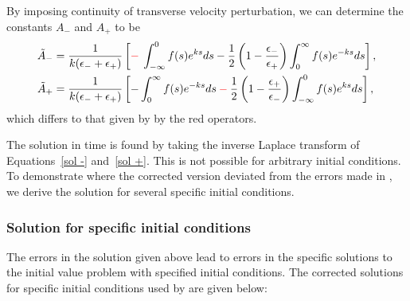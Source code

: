 \documentclass[12pt]{../style-files/ociamthesis}
\begin{document}
By imposing continuity of transverse velocity perturbation, we can determine the constants $A_-$ and $A_+$ to be
\begin{align}
\tilde{A}_- & = \frac{1}{k(\epsilon_- + \epsilon_+)}\left[\textcolor{red}{-} \: \int_{-\infty}^0 f(s)e^{ks} ds - \frac{1}{2}\left(1 - \frac{\epsilon_-}{\epsilon_+}\right)\int_0^\infty f(s)e^{-ks} ds\right], \\
\tilde{A}_+ & = \frac{1}{k(\epsilon_- + \epsilon_+)}\left[-\int_0^\infty f(s)e^{-ks} ds \: \textcolor{red}{-} \: \frac{1}{2}\left(1 - \frac{\epsilon_+}{\epsilon_-}\right)\int_{-\infty}^0 f(s)e^{ks} ds\right],
\end{align}
which differs to that given by \cite{rae_etal81} by the red operators.

The solution in time is found by taking the inverse Laplace transform of Equations~\eqref{sol -} and~\eqref{sol +}. This is not possible for arbitrary initial conditions. To demonstrate where the corrected version deviated from the errors made in \cite{rae_etal81}, we derive the solution for several specific initial conditions.
\color{red}

\subsubsection{Solution for specific initial conditions}

The errors in the solution given above lead to errors in the specific solutions to the initial value problem with specified initial conditions. The corrected solutions for specific initial conditions used by \cite{rae_etal81} are given below:
\end{document}
